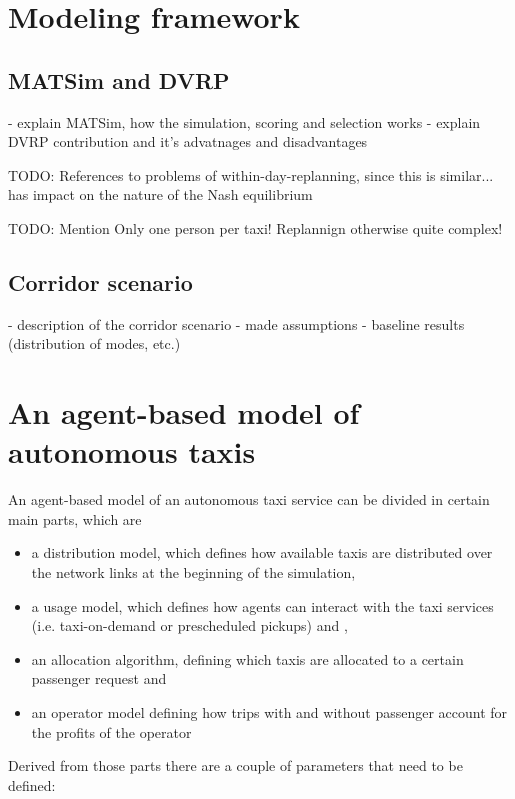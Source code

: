 \documentclass[10pt,a4paper,draft]{report}
\begin{document}
\chapter{Modeling framework}

\section{MATSim and DVRP}

- explain MATSim, how the simulation, scoring and selection works
- explain DVRP contribution and it's advatnages and disadvantages

TODO: References to problems of within-day-replanning, since this is similar... has impact on the nature of the Nash equilibrium

TODO: Mention Only one person per taxi!
Replannign otherwise quite complex!

\section{Corridor scenario}

- description of the corridor scenario
- made assumptions
- baseline results (distribution of modes, etc.)

\chapter{An agent-based model of autonomous taxis}

An agent-based model of an autonomous taxi service can be divided in certain main parts, which are

\begin{itemize}
\item a distribution model, which defines how available taxis are distributed over the network links at the beginning of the simulation,
\item a usage model, which defines how agents can interact with the taxi services (i.e. taxi-on-demand or prescheduled pickups) and ,
\item an allocation algorithm, defining which taxis are allocated to a certain passenger request and
\item an operator model defining how trips with and without passenger account for the profits of the operator
\end{itemize}

Derived from those parts there are a couple of parameters that need to be defined:
\end{document}
